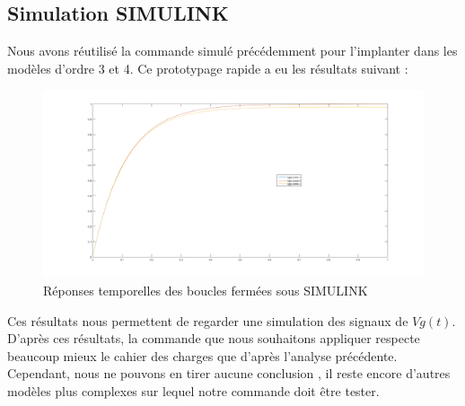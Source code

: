 \subsection{Simulation SIMULINK}
Nous avons réutilisé la commande simulé précédemment pour l'implanter dans les modèles d'ordre 3 et 4. Ce prototypage rapide a eu les résultats suivant :
\begin{figure}[!ht]
\centering
\includegraphics[scale=.3]{./III/figure/res_SIMULINK.png}
\caption{Réponses temporelles des boucles fermées sous SIMULINK}
\end{figure}

Ces résultats nous permettent de regarder une simulation des signaux de $Vg(t)$. D'après ces résultats, la commande que nous souhaitons appliquer respecte beaucoup mieux le cahier des charges que d'après l'analyse précédente. Cependant, nous ne pouvons en tirer aucune conclusion , il reste encore d'autres modèles plus complexes sur lequel notre commande doit être tester.


